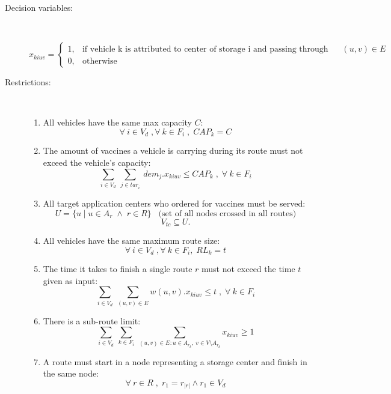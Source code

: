 \documentclass{article}
\begin{document}
\begin{description}
\item[Decision variables:]\
     \begin{itemize}
 $$ x_{kiuv} = 
  \begin{cases}
    1, & \text{if vehicle k is attributed to center of storage i and passing through edge}\:(u,v) \in E  \\
    0, & \text{otherwise }
  \end{cases}$$
    \end{itemize}
\end{description}

\begin{description}
\item[Restrictions:]\
 \begin{enumerate}
     \item All vehicles have the same max capacity $C$:
         \[ \forall\:i \in V_d \;,\forall\:k \in F_i\;,\; CAP_k = C \]
     
     \item The amount of vaccines a vehicle is carrying during its route must not exceed the vehicle's capacity:
        \[\sum_{i\in V_d^{}}\: \sum_{j\in tar_i^{}}\:  dem_j.x_{kiuv} \leq CAP_k\;,\;\forall\:k \in F_i\]
     
     
    \item All target application centers who ordered for vaccines must be served:\\
        \[  U = \{u\;|\; u \in A_r \;\wedge\; r \in R\}\;\;\;\text{(set of all nodes crossed in all routes)}\]
    \[V_{tc} \subseteq U.\]
    
    
    \item All vehicles have the same maximum route size:
        \[ \forall\:i \in V_d \;,\forall\:k \in F_i,\; RL_k = t \]
        
    \item The time it takes to finish a single route $r$ must not exceed the time $t$ given as input:
        \[ \sum_{i\in V_d^{}}\: \sum_{(u,v)\in E^{}} w(u,v).x_{kiuv} \leq t\;,\; \forall\:k\in F_i \]

    \item There is a sub-route limit:
        \[ \sum_{i\in V_d^{}}\: \sum_{k \in F_i^{}}\: \sum_{(u,v)\in E^{}:u \in A_{r_k},\:v \in V \setminus A_{r_k}} x_{kiuv} \geqslant 1 \]

    \item A route must start in a node representing a storage center and finish in the same node:
        \[ \forall\:r \in R \;,\; r_1 = r_{|r|} \wedge r_1 \in V_d\]


\end{enumerate}
\end{description}
\end{document}
